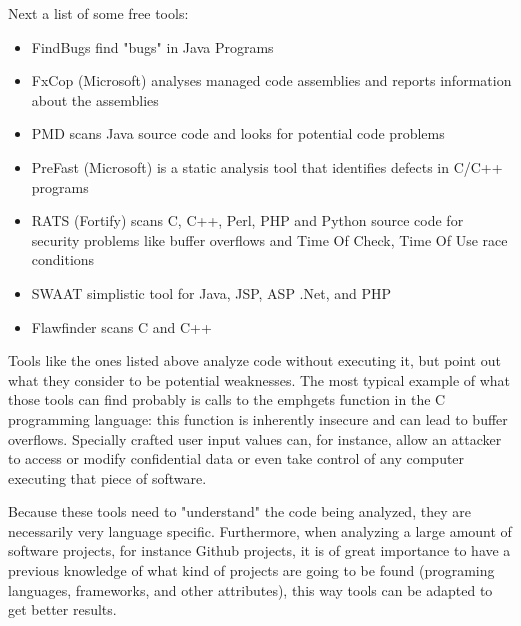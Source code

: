 Next a list of some free tools:
\begin{itemize}
\item\textsf{FindBugs} find "bugs" in Java Programs
\item\textsf{FxCop (Microsoft)} analyses managed code assemblies and reports information about the assemblies
\item\textsf{PMD} scans Java source code and looks for potential code problems
\item\textsf{PreFast} (Microsoft) is a static analysis tool that identifies defects in C/C++ programs
\item\textsf{RATS} (Fortify) scans C, C++, Perl, PHP and Python source code for security problems like buffer overflows and Time Of Check, Time Of Use race conditions
\item\textsf{SWAAT} simplistic tool for Java, JSP, ASP .Net, and PHP
\item\textsf{Flawfinder} scans C and C++
\end{itemize}

Tools like the ones listed above analyze code without executing it, but point out what they consider to be potential weaknesses.
The most typical example of what those tools can find probably is calls to the emph{gets} function in
the C programming language: this function is inherently insecure and can lead to buffer
overflows. Specially crafted user input values can, for instance, allow an attacker to access
or modify confidential data or even take control of any computer executing that piece of
software.

Because these tools need to "understand" the code being analyzed, they are necessarily very language specific.
Furthermore, when analyzing a large amount of software projects, for instance Github projects,
it is of great importance to have a previous knowledge of what kind of projects  are going to be found (programing languages, frameworks, and other attributes),
this way tools can be adapted to get better results.

